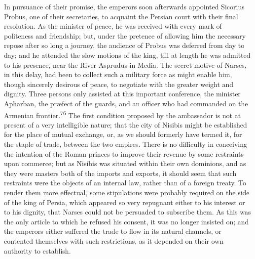 In pursuance of their promise, the emperors soon afterwards
appointed Sicorius Probus, one of their secretaries, to acquaint
the Persian court with their final resolution. As the minister of
peace, he was received with every mark of politeness and
friendship; but, under the pretence of allowing him the necessary
repose after so long a journey, the audience of Probus was
deferred from day to day; and he attended the slow motions of the
king, till at length he was admitted to his presence, near the
River Asprudus in Media. The secret motive of Narses, in this
delay, had been to collect such a military force as might enable
him, though sincerely desirous of peace, to negotiate with the
greater weight and dignity. Three persons only assisted at this
important conference, the minister Apharban, the præfect of the
guards, and an officer who had commanded on the Armenian
frontier.\textsuperscript{76} The first condition proposed by the ambassador is
not at present of a very intelligible nature; that the city of
Nisibis might be established for the place of mutual exchange,
or, as we should formerly have termed it, for the staple of
trade, between the two empires. There is no difficulty in
conceiving the intention of the Roman princes to improve their
revenue by some restraints upon commerce; but as Nisibis was
situated within their own dominions, and as they were masters
both of the imports and exports, it should seem that such
restraints were the objects of an internal law, rather than of a
foreign treaty. To render them more effectual, some stipulations
were probably required on the side of the king of Persia, which
appeared so very repugnant either to his interest or to his
dignity, that Narses could not be persuaded to subscribe them. As
this was the only article to which he refused his consent, it was
no longer insisted on; and the emperors either suffered the trade
to flow in its natural channels, or contented themselves with
such restrictions, as it depended on their own authority to
establish.


